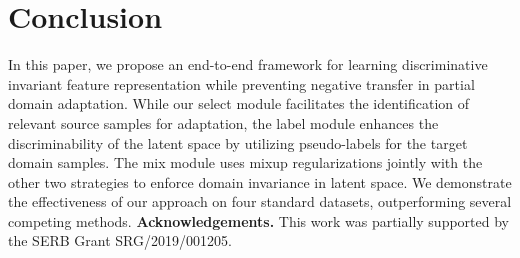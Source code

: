\documentclass[10pt,twocolumn,letterpaper]{article}
\begin{document}
\setlength{\tabcolsep}{1pt}
\begin{table}[tbp]




\scriptsize
{}

\vspace{-2mm}
\caption{\small \textbf{Wasserstein Distance between Domains.} 
Table shows values for two randomly sampled tasks from \textbf{Office-31} and \textbf{Office-Home}. The values are normalized by assuming the distance for  to be equal to 1.0, where  represents all source samples for the corresponding tasks. Numbers show that samples selected by our selector network is closer to the target domain while discarded samples are very dissimilar to the target domain.
}
\label{table:wasser} \vspace{-3mm}
\end{table}
  

\section{Conclusion}
\label{sec:conclusions}

In this paper, we propose an end-to-end framework for learning discriminative invariant feature representation while preventing negative transfer in partial domain adaptation. While our select module facilitates the identification of relevant source samples for adaptation, the label module enhances the discriminability of the latent space by utilizing pseudo-labels for the target domain samples. The mix module uses mixup regularizations jointly with the other two strategies to enforce domain invariance in latent space.     
We demonstrate the effectiveness of our approach on four standard datasets, outperforming several competing methods. 
\vspace{2mm}
\noindent\textbf{Acknowledgements.} This work was partially supported by the SERB Grant SRG/2019/001205.
\end{document}
